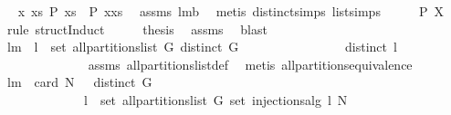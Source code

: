 \begin{isabellebody}
\ \isamarkupfalse%
\ {\isachardoublequoteopen}{\isasymforall}x\ xs{\isachardot}\ {\isacharquery}P\ xs\ {\isasymlongrightarrow}\ {\isacharquery}P\ {\isacharparenleft}x{\isacharhash}xs{\isacharparenright}{\isachardoublequoteclose}\ \isamarkupfalse%
\ assms{\isacharparenleft}{}{\isacharparenright}\ lm{}{}b\ \isamarkupfalse%
\ {\isacharparenleft}metis\ distinct{\isachardot}simps{\isacharparenleft}{}{\isacharparenright}\ list{\isachardot}simps{\isacharparenleft}{}{}{\isacharparenright}{\isacharparenright}\isanewline
\ \ \isamarkupfalse%
\ \isamarkupfalse%
\ {\isachardoublequoteopen}{\isacharquery}P\ X{\isachardoublequoteclose}\ \isamarkupfalse%
\ {\isacharparenleft}rule\ structInduct{\isacharparenright}\isanewline
\ \ \isamarkupfalse%
\ \isamarkupfalse%
\ {\isacharquery}thesis\ \isamarkupfalse%
\ assms{\isacharparenleft}{}{\isacharparenright}\ \isamarkupfalse%
\ blast\isanewline
{}\isamarkupfalse%
%
\endisatagproof
{\isafoldproof}%
%
\isadelimproof
\isanewline
%
\endisadelimproof
\isanewline
\isanewline
{}\isamarkupfalse%
\ lm{}{}{\isacharcolon}\ \ {\isachardoublequoteopen}l\ {\isasymin}\ set\ {\isacharparenleft}all{\isacharunderscore}partitions{\isacharunderscore}list\ G{\isacharparenright}{\isachardoublequoteclose}\ {\isachardoublequoteopen}distinct\ G{\isachardoublequoteclose}\ \isanewline
\ \ \ \ \ \ \ \ \ \ \ \ \ \ \ {\isachardoublequoteopen}distinct\ l{\isachardoublequoteclose}\ \isanewline
%
\isadelimproof
\ \ \ \ \ \ \ \ \ \ \ \ %
\endisadelimproof
%
\isatagproof
{}\isamarkupfalse%
\ assms\ all{\isacharunderscore}partitions{\isacharunderscore}list{\isacharunderscore}def\ \isamarkupfalse%
\ {\isacharparenleft}metis\ all{\isacharunderscore}partitions{\isacharunderscore}equivalence{\isacharprime}{\isacharparenright}%
\endisatagproof
{\isafoldproof}%
%
\isadelimproof
\isanewline
%
\endisadelimproof
\isanewline
\isanewline
{}\isamarkupfalse%
\ lm{}{}{\isacharcolon}\ \ {\isachardoublequoteopen}card\ N\ {\isachargreater}\ {}{\isachardoublequoteclose}\ {\isachardoublequoteopen}distinct\ G{\isachardoublequoteclose}\ \isanewline
\ \ \ \ \ \ \ \ \ \ \ \ \ {\isachardoublequoteopen}{\isasymforall}l\ {\isasymin}\ set\ {\isacharparenleft}all{\isacharunderscore}partitions{\isacharunderscore}list\ G{\isacharparenright}{\isachardot}\ set\ {\isacharparenleft}injections{\isacharunderscore}alg\ l\ N{\isacharparenright}\ {\isacharequal}\ \isanewline

\end{isabellebody}
